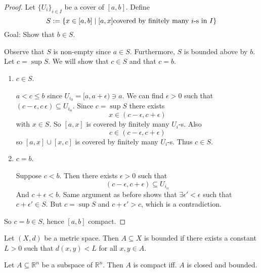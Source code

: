 \begin{proof}
  Let \( \{ U_i \} _{i \in I} \) be a cover of \( [a, b] \).
  Define
  \[
    S := \{ x \in [a, b] \mid [a, x] \text{covered by finitely many \( i \)-s in \( I \)} \} 
  \]
  Goal: Show that \( b \in S \).

  Observe that \( S \) is non-empty since \( a \in S \).
  Furthermore, \( S \) is bounded above by \( b \).
  Let \( c = \sup S \). We will show that \( c \in S \)
  and that \( c = b \).
  \begin{enumerate}
    \item \( c \in S \).
      
      \( a < c \le b \) since \( U_{i_0} = [a, a+\epsilon) \ni a \).
      We can find \( \epsilon > 0 \) such that \( (c-\epsilon, c \ \epsilon) \subseteq U_{i_\alpha} \).
      Since \( c = \sup S \) there exists \[ x \in (c - \epsilon, c + \epsilon) \] with \( x \in S \).
      So \( [a, x] \) is covered by finitely many \( U_i \)-s.
      Also \[ c \in (c - \epsilon, c + \epsilon) \] so 
      \( [a, x] \cup [x, c] \) is covered by finitely many
      \( U_i \)-s. Thus \( c \in S \).

    \item \( c = b \).

        Suppose \( c < b \). Then there exists
        \( \epsilon > 0 \) such that
        \[
          (c - \epsilon, c + \epsilon) \subseteq U_{i_\alpha}
        \]
        And \( c + \epsilon < b \).
        Same argument as before shows that
        \( \exists \epsilon' < \epsilon \) such that
        \( c + \epsilon' \in S \). But \( c = \sup S \)
        and \( c + \epsilon' > c \), which is a contradiction.
  \end{enumerate}
  So \( c = b \in S \), hence \( [a, b] \) compact.
\end{proof}

\begin{definition}[boundedness]
    Let \( (X, d) \) be a metric space.
    Then \( A \subseteq X \) is bounded if there exists
    a constant \( L > 0 \) such that \( d(x, y) < L \)  for all \( x, y \in A \).
\end{definition}

\begin{theorem}
  Let \( A \subseteq \mathbb{R}^n \) be a subspace of \( \mathbb{R}^n \).
  Then \( A \) is compact iff. \( A \) is closed and bounded.
\end{theorem}

